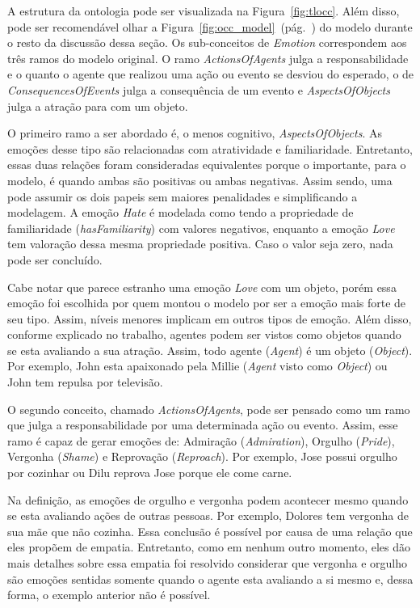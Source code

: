 A estrutura da ontologia pode ser visualizada na Figura~\ref{fig:tlocc}. Além
disso, pode ser recomendável olhar a
Figura~\ref{fig:occ_model}~(pág.~\pageref{fig:occ_model}) do modelo \occ
durante o resto da discussão dessa seção. Os sub-conceitos de \emph{Emotion}
correspondem aos três ramos do modelo original.
O ramo \emph{ActionsOfAgents} julga a responsabilidade e o quanto o agente que
realizou uma ação ou evento se desviou do esperado, o de
\emph{ConsequencesOfEvents} julga a consequência de um evento e
\emph{AspectsOfObjects} julga a atração para com um objeto.

O primeiro ramo a ser abordado é, o menos cognitivo, \emph{AspectsOfObjects}.
As emoções desse tipo são relacionadas com atratividade e familiaridade.
Entretanto, essas duas relações foram consideradas equivalentes porque o
importante, para o modelo, é quando ambas são positivas ou ambas negativas.
Assim sendo, uma pode assumir os dois papeis sem maiores penalidades e
simplificando a modelagem. A emoção \emph{Hate} é modelada como tendo a
propriedade de familiaridade (\emph{hasFamiliarity}) com valores negativos,
enquanto a emoção \emph{Love} tem valoração dessa mesma propriedade positiva.
Caso o valor seja zero, nada pode ser concluído.

Cabe notar que parece estranho uma emoção \emph{Love} com um objeto, porém
essa emoção foi escolhida por quem montou o modelo por ser a emoção mais forte
de seu tipo. Assim, níveis menores implicam em outros tipos de emoção. Além
disso, conforme explicado no trabalho, agentes podem ser vistos como objetos
quando se esta avaliando a sua atração. Assim, todo agente (\emph{Agent}) é um
objeto (\emph{Object}). Por exemplo, John esta apaixonado pela Millie
(\emph{Agent} visto como \emph{Object}) ou John tem repulsa por televisão.

O segundo conceito, chamado \emph{ActionsOfAgents}, pode ser pensado como
um ramo que julga a responsabilidade por uma determinada ação ou evento.
Assim, esse ramo é capaz de gerar emoções de: Admiração (\emph{Admiration}),
Orgulho (\emph{Pride}), Vergonha (\emph{Shame}) e Reprovação
(\emph{Reproach}). Por exemplo, Jose possui orgulho por cozinhar ou Dilu
reprova Jose porque ele come carne.

Na definição, as emoções de orgulho e vergonha podem acontecer mesmo quando se
esta avaliando ações de outras pessoas. Por exemplo, Dolores tem vergonha de
sua mãe que não cozinha. Essa conclusão é possível por causa de uma relação
que eles propõem de empatia. Entretanto, como em nenhum outro momento, eles
dão mais detalhes sobre essa empatia foi resolvido considerar que vergonha e
orgulho são emoções sentidas somente quando o agente esta avaliando a si mesmo
e, dessa forma, o exemplo anterior não é possível. \dev{}


